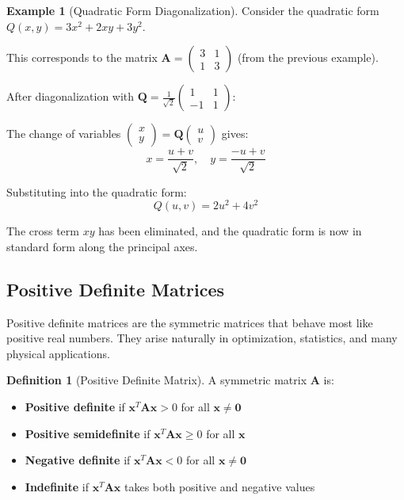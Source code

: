 \documentclass[12pt]{article}
\numberwithin{equation}{section}
\newcommand{\vect}[1]{\boldsymbol{#1}}   %
\newcommand{\mat}[1]{\mathbf{#1}}        %
\theoremstyle{plain}
\theoremstyle{definition}
\newtheorem{definition}[theorem]{Definition}
\newtheorem{example}[theorem]{Example}
\theoremstyle{remark}
\begin{document}
\begin{example}[Quadratic Form Diagonalization]
Consider the quadratic form $Q(x, y) = 3x^2 + 2xy + 3y^2$.

This corresponds to the matrix $\mat{A} = \begin{pmatrix} 3 & 1 \\ 1 & 3 \end{pmatrix}$ (from the previous example).

After diagonalization with $\mat{Q} = \frac{1}{\sqrt{2}}\begin{pmatrix} 1 & 1 \\ -1 & 1 \end{pmatrix}$:

The change of variables $\begin{pmatrix} x \\ y \end{pmatrix} = \mat{Q}\begin{pmatrix} u \\ v \end{pmatrix}$ gives:
$$x = \frac{u + v}{\sqrt{2}}, \quad y = \frac{-u + v}{\sqrt{2}}$$

Substituting into the quadratic form:
$$Q(u, v) = 2u^2 + 4v^2$$

The cross term $xy$ has been eliminated, and the quadratic form is now in standard form along the principal axes.
\end{example}

\subsection{Positive Definite Matrices}

Positive definite matrices are the symmetric matrices that behave most like positive real numbers. They arise naturally in optimization, statistics, and many physical applications.

\begin{definition}[Positive Definite Matrix]
A symmetric matrix $\mat{A}$ is:
\begin{itemize}
\item \textbf{Positive definite} if $\vect{x}^T\mat{A}\vect{x} > 0$ for all $\vect{x} \neq \vect{0}$
\item \textbf{Positive semidefinite} if $\vect{x}^T\mat{A}\vect{x} \geq 0$ for all $\vect{x}$
\item \textbf{Negative definite} if $\vect{x}^T\mat{A}\vect{x} < 0$ for all $\vect{x} \neq \vect{0}$
\item \textbf{Indefinite} if $\vect{x}^T\mat{A}\vect{x}$ takes both positive and negative values
\end{itemize}
\end{definition}
\end{document}
